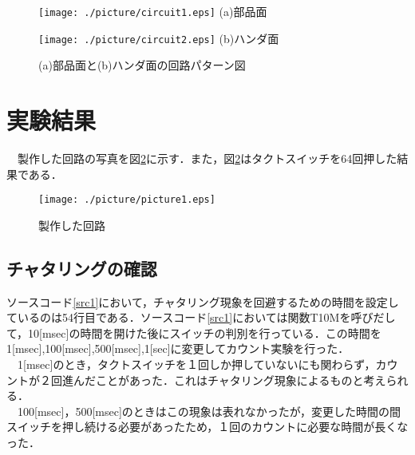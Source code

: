 \documentclass[11pt,a4paper]{jsarticle}
\begin{document}
\begin{figure}[h]
 \begin{center}
  \begin{minipage}[t]{0.33\hsize}
   \begin{center}
    \texttt{[image: ./picture/circuit1.eps]}
    (a)部品面
   \end{center}
  \end{minipage}
  
 \begin{minipage}[t]{0.33\hsize}
  \begin{center}
   \texttt{[image: ./picture/circuit2.eps]}
   (b)ハンダ面
  \end{center}
 \end{minipage}
  
  \caption{(a)部品面と(b)ハンダ面の回路パターン図}
  \label{fig1}
 \end{center}
\end{figure}



\newpage
 \section{実験結果}
 　製作した回路の写真を図\ref{fig2}に示す．また，図\ref{fig2}はタクトスイッチを64回押した結果である．

\begin{figure}[bp]
 \begin{center}
  \texttt{[image: ./picture/picture1.eps]}
  \caption{製作した回路}
  \label{fig2}
 \end{center}
\end{figure}

  \subsection{チャタリングの確認}
  ソースコード\ref{src1}において，チャタリング現象を回避するための時間を設定しているのは54行目である．ソースコード\ref{src1}においては関数T10Mを呼びだして，10[msec]の時間を開けた後にスイッチの判別を行っている．この時間を1[msec],100[msec],500[msec],1[sec]に変更してカウント実験を行った． \\
　1[msec]のとき，タクトスイッチを１回しか押していないにも関わらず，カウントが２回進んだことがあった．これはチャタリング現象によるものと考えられる． \\
　100[msec]，500[msec]のときはこの現象は表れなかったが，変更した時間の間スイッチを押し続ける必要があったため，１回のカウントに必要な時間が長くなった．
\end{document}
